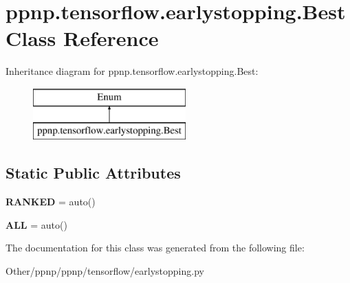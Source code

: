 \hypertarget{classppnp_1_1tensorflow_1_1earlystopping_1_1Best}{}\section{ppnp.\+tensorflow.\+earlystopping.\+Best Class Reference}
\label{classppnp_1_1tensorflow_1_1earlystopping_1_1Best}
Inheritance diagram for ppnp.\+tensorflow.\+earlystopping.\+Best\+:\begin{figure}[H]
\begin{center}
\leavevmode
\includegraphics[height=2.000000cm]{classppnp_1_1tensorflow_1_1earlystopping_1_1Best}
\end{center}
\end{figure}
\subsection*{Static Public Attributes}
\begin{DoxyCompactItemize}
\item 
\mbox{\label{classppnp_1_1tensorflow_1_1earlystopping_1_1Best_a98da01b0a585b68e82bc5785babbf2c2}} 
{\bfseries R\+A\+N\+K\+ED} = auto()
\item 
\mbox{\label{classppnp_1_1tensorflow_1_1earlystopping_1_1Best_a6e65e1b318ae14fbea46a198fa114d08}} 
{\bfseries A\+LL} = auto()
\end{DoxyCompactItemize}


The documentation for this class was generated from the following file\+:\begin{DoxyCompactItemize}
\item 
Other/ppnp/ppnp/tensorflow/earlystopping.\+py\end{DoxyCompactItemize}
